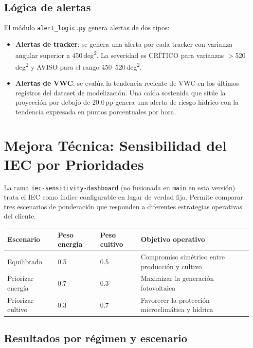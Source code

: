\documentclass[11pt,a4paper]{article}
\begin{document}
\subsection{Lógica de alertas}

El módulo \texttt{alert\_logic.py} genera alertas de dos tipos:

\begin{itemize}
  \item \textbf{Alertas de tracker}: se genera una alerta por cada tracker con varianza angular
    superior a 450\,deg\textsuperscript{2}. La severidad es CRÍTICO para varianzas $>$520\,deg\textsuperscript{2}
    y AVISO para el rango 450–520\,deg\textsuperscript{2}.
  \item \textbf{Alertas de VWC}: se evalúa la tendencia reciente de VWC en los últimos registros
    del dataset de modelización. Una caída sostenida que sitúe la proyección por debajo de
    20.0\,pp genera una alerta de riesgo hídrico con la tendencia expresada en puntos
    porcentuales por hora.
\end{itemize}

\section{Mejora Técnica: Sensibilidad del IEC por Prioridades}

La rama \texttt{iec-sensitivity-dashboard} (no fusionada en \texttt{main} en esta versión) trata
el IEC como índice configurable en lugar de verdad fija. Permite comparar tres escenarios
de ponderación que responden a diferentes estrategias operativas del cliente.

\begin{longtable}{p{} p{} p{} p{}}
\toprule
\textbf{Escenario} & \textbf{Peso energía} & \textbf{Peso cultivo} & \textbf{Objetivo operativo} \\
\midrule
Equilibrado       & 0.5 & 0.5 & Compromiso simétrico entre producción y cultivo \\
Priorizar energía & 0.7 & 0.3 & Maximizar la generación fotovoltaica \\
Priorizar cultivo & 0.3 & 0.7 & Favorecer la protección microclimática y hídrica \\
\bottomrule
\end{longtable}

\subsection{Resultados por régimen y escenario}
\end{document}
